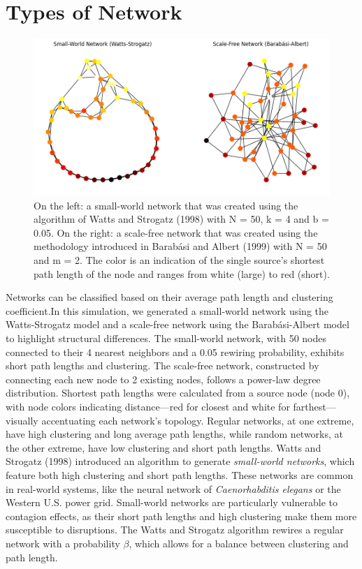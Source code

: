 \documentclass{article} %
\begin{document}
\section{Types of Network}

\begin{figure}[h]
    \centering
    \includegraphics[width=1.0\linewidth]{Figures/Figure_1.png}
    \caption{On the left: a small-world network that was created using the algorithm of Watts and Strogatz (1998) with N = 50, k = 4 and b = 0.05. On the right: a scale-free network that was created using the methodology introduced in Barabási and Albert (1999) with N = 50 and m = 2. The color is an indication of the single source's shortest path length of the node and ranges from white (large) to red (short).}
    \label{fig:figure1}
\end{figure}

Networks can be classified based on their average path length and clustering coefficient.In this simulation, we generated a small-world network using the Watts-Strogatz model and a scale-free network using the Barabási-Albert model to highlight structural differences. The small-world network, with 50 nodes connected to their 4 nearest neighbors and a 0.05 rewiring probability, exhibits short path lengths and clustering. The scale-free network, constructed by connecting each new node to 2 existing nodes, follows a power-law degree distribution. Shortest path lengths were calculated from a source node (node 0), with node colors indicating distance—red for closest and white for farthest—visually accentuating each network's topology. Regular networks, at one extreme, have high clustering and long average path lengths, while random networks, at the other extreme, have low clustering and short path lengths. Watts and Strogatz (1998) introduced an algorithm to generate \textit{small-world networks}, which feature both high clustering and short path lengths. These networks are common in real-world systems, like the neural network of \textit{Caenorhabditis elegans} or the Western U.S. power grid. Small-world networks are particularly vulnerable to contagion effects, as their short path lengths and high clustering make them more susceptible to disruptions. The Watts and Strogatz algorithm rewires a regular network with a probability $\beta$, which allows for a balance between clustering and path length.
\end{document}
